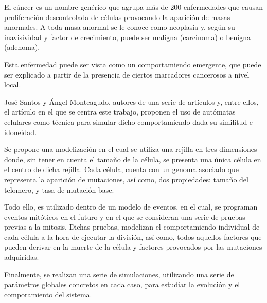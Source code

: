 El cáncer es un nombre genérico que agrupa más de 200 enfermedades que causan proliferación
descontrolada de células provocando la aparición de masas anormales. A toda masa anormal se
le conoce como neoplasia y, según su inavisividad y factor de crecimiento, puede ser maligna
(carcinoma) o benigna (adenoma).

Esta enfermedad puede ser vista como un comportamiendo emergente, que puede ser explicado a
partir de la presencia de ciertos marcadores cancerosos a nivel local.

José Santos y Ángel Monteagudo, autores de una serie de artículos y, entre ellos, el artículo
en el que se centra este trabajo, proponen el uso de autómatas celulares como técnica para
simular dicho comportamiendo dada su similitud e idoneidad.

Se propone una modelización en el cual se utiliza una rejilla en tres dimensiones donde, sin
tener en cuenta el tamaño de la célula, se presenta una única célula en el centro de dicha
rejilla. Cada célula, cuenta con un genoma asociado que representa la aparición de mutaciones,
así como, dos propiedades: tamaño del telomero, y tasa de mutación base.

Todo ello, es utilizado dentro de un modelo de eventos, en el cual, se programan eventos mitóticos
en el futuro y en el que se consideran una serie de pruebas previas a la mitosis. Dichas pruebas,
modelizan el comportamiendo individual de cada célula a la hora de ejecutar la división, así como,
todos aquellos factores que pueden derivar en la muerte de la célula y factores provocados
por las mutaciones adquiridas.

Finalmente, se realizan una serie de simulaciones, utilizando una serie de parámetros globales
concretos en cada caso, para estudiar la evolución y el comporamiento del sistema.
